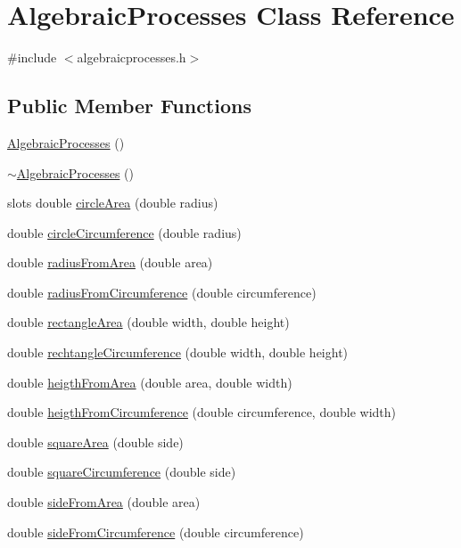 \hypertarget{class_algebraic_processes}{}\section{Algebraic\+Processes Class Reference}
\label{class_algebraic_processes}


{\ttfamily \#include $<$algebraicprocesses.\+h$>$}

\subsection*{Public Member Functions}
\begin{DoxyCompactItemize}
\item 
\mbox{\hyperlink{class_algebraic_processes_ac411dfd34f3bf9c42eb5f111e7f705d5}{Algebraic\+Processes}} ()
\item 
\mbox{\hyperlink{class_algebraic_processes_a0599da6d65adc6ff61681190acf47d7e}{$\sim$\+Algebraic\+Processes}} ()
\item 
slots double \mbox{\hyperlink{class_algebraic_processes_a81cf98903ba3a162d0ed3560113989d5}{circle\+Area}} (double radius)
\item 
double \mbox{\hyperlink{class_algebraic_processes_a8930997d7ae198bc83766f3d9ca90441}{circle\+Circumference}} (double radius)
\item 
double \mbox{\hyperlink{class_algebraic_processes_a1f9420d89cd604a115019eaf25397d61}{radius\+From\+Area}} (double area)
\item 
double \mbox{\hyperlink{class_algebraic_processes_a30a85ad3389c5a2c55e26d8ed1d8ef05}{radius\+From\+Circumference}} (double circumference)
\item 
double \mbox{\hyperlink{class_algebraic_processes_ac3b29221b6fe85534272cb75ffb9ae36}{rectangle\+Area}} (double width, double height)
\item 
double \mbox{\hyperlink{class_algebraic_processes_ae2e5b4fc2cc551b0905408c04112310d}{rechtangle\+Circumference}} (double width, double height)
\item 
double \mbox{\hyperlink{class_algebraic_processes_a6d4d89f44df6cc113ebf87582385dc50}{heigth\+From\+Area}} (double area, double width)
\item 
double \mbox{\hyperlink{class_algebraic_processes_a6f1f66ff2e4b9636087652300539a629}{heigth\+From\+Circumference}} (double circumference, double width)
\item 
double \mbox{\hyperlink{class_algebraic_processes_a9adf590f2f20c117034991ab2680af2a}{square\+Area}} (double side)
\item 
double \mbox{\hyperlink{class_algebraic_processes_ace12d0a56d85541489c2c6370193417b}{square\+Circumference}} (double side)
\item 
double \mbox{\hyperlink{class_algebraic_processes_a21eb5b5f32ef6214bde530e4b3c043e6}{side\+From\+Area}} (double area)
\item 
double \mbox{\hyperlink{class_algebraic_processes_aff19adfe08028c3272c4c3208b0c9605}{side\+From\+Circumference}} (double circumference)
\end{DoxyCompactItemize}
